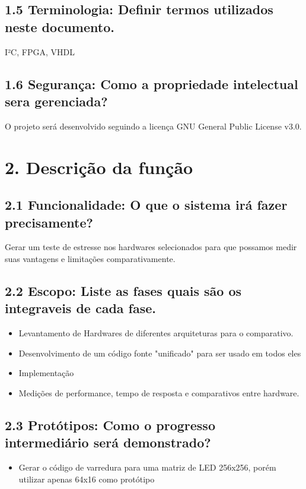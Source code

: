\documentclass[11pt]{article}
\begin{document}
\subsection{1.5 Terminologia: Definir termos utilizados neste documento.}
\label{sec:orgd5f1873}
I²C, FPGA, VHDL
\subsection{1.6 Segurança: Como a propriedade intelectual sera gerenciada?}
\label{sec:orgde0a899}
O projeto será desenvolvido seguindo a licença GNU General Public License v3.0.

\section{2. Descrição da função}
\label{sec:org3ece0e1}

\subsection{2.1 Funcionalidade: O que o sistema irá fazer precisamente?}
\label{sec:org0f21608}
Gerar um teste de estresse nos hardwares selecionados para que possamos medir suas vantagens e limitações comparativamente.

\subsection{2.2 Escopo: Liste as fases quais são os integraveis de cada fase.}
\label{sec:org6da067d}
\begin{itemize}
\item Levantamento de Hardwares de diferentes arquiteturas para o comparativo.
\item Desenvolvimento de um código fonte "unificado" para ser usado em todos eles
\item Implementação
\item Medições de performance, tempo de resposta e comparativos entre hardware.
\end{itemize}

\subsection{2.3 Protótipos: Como o progresso intermediário será demonstrado?}
\label{sec:orgf88c5fe}
\begin{itemize}
\item Gerar o código de varredura para uma matriz de LED 256x256, porém utilizar apenas 64x16 como protótipo
\end{itemize}
\end{document}
